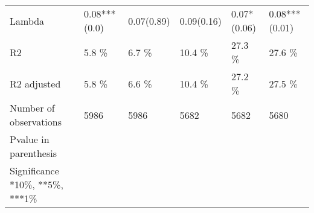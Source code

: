 \begin{tabular}{llllll}
Lambda                          &    0.08***(0.0) &     0.07(0.89) &     0.09(0.16) &    0.07*(0.06) &  0.08***(0.01) \\
R2                              &           5.8 \% &          6.7 \% &         10.4 \% &         27.3 \% &         27.6 \% \\
R2 adjusted                     &           5.8 \% &          6.6 \% &         10.4 \% &         27.2 \% &         27.5 \% \\
Number of observations          &            5986 &           5986 &           5682 &           5682 &           5680 \\
Pvalue in parenthesis           &                 &                &                &                &                \\
Significance *10\%, **5\%, ***1\%  &                 &                &                &                &                \\
\bottomrule
\end{tabular}
